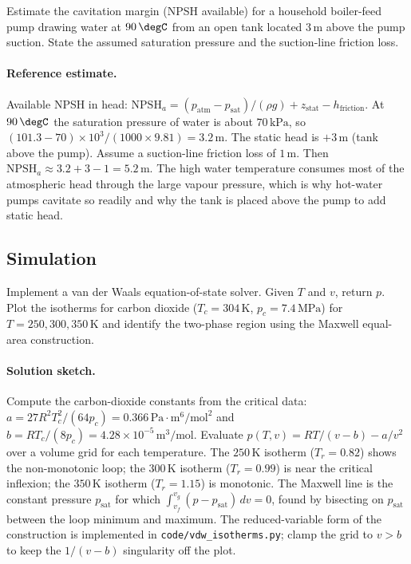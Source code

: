 \begin{exercise}
Estimate the cavitation margin (NPSH available) for a household
boiler-feed pump drawing water at $90\,\degC$ from an open tank
located $3\,\text{m}$ above the pump suction. State the assumed
saturation pressure and the suction-line friction loss.

\paragraph{Reference estimate.} Available NPSH in head:
$\text{NPSH}_a = (p_{\text{atm}} - p_{\text{sat}})/(\rho g) + z_{\text{stat}}
- h_{\text{friction}}$. At $90\,\degC$ the saturation pressure of water is
about $70\,\text{kPa}$, so $(101.3 - 70)\times 10^3/(1000\times 9.81) =
3.2\,\text{m}$. The static head is $+3\,\text{m}$ (tank above the pump).
Assume a suction-line friction loss of $1\,\text{m}$. Then
$\text{NPSH}_a \approx 3.2 + 3 - 1 = 5.2\,\text{m}$. The high water
temperature consumes most of the atmospheric head through the large
vapour pressure, which is why hot-water pumps cavitate so readily and
why the tank is placed above the pump to add static head.
\end{exercise}

\subsection*{Simulation}

\begin{exercise}
Implement a van der Waals equation-of-state solver. Given $T$ and
$v$, return $p$. Plot the isotherms for carbon dioxide ($T_c = 304\,
\si{\kelvin}$, $p_c = 7.4\,\text{MPa}$) for $T = 250, 300, 350\,\si{
\kelvin}$ and identify the two-phase region using the Maxwell
equal-area construction.

\paragraph{Solution sketch.} Compute the carbon-dioxide constants from
the critical data: $a = 27R^2T_c^2/(64p_c) = 0.366\,\text{Pa}\cdot
\text{m}^6/\text{mol}^2$ and $b = RT_c/(8p_c) = 4.28\times 10^{-5}\,
\text{m}^3/\text{mol}$. Evaluate $p(T, v) = RT/(v - b) - a/v^2$ over a
volume grid for each temperature. The $250\,\si{\kelvin}$ isotherm
($T_r = 0.82$) shows the non-monotonic loop; the $300\,\si{\kelvin}$
isotherm ($T_r = 0.99$) is near the critical inflexion; the $350\,
\si{\kelvin}$ isotherm ($T_r = 1.15$) is monotonic. The Maxwell line is
the constant pressure $p_{\text{sat}}$ for which $\int_{v_f}^{v_g}(p -
p_{\text{sat}})\,dv = 0$, found by bisecting on $p_{\text{sat}}$ between
the loop minimum and maximum. The reduced-variable form of the
construction is implemented in \texttt{code/vdw\_isotherms.py}; clamp the
grid to $v > b$ to keep the $1/(v - b)$ singularity off the plot.
\end{exercise}


